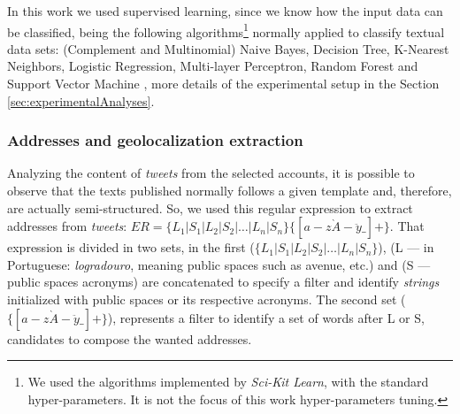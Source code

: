 \documentclass[runningheads]{llncs}
\begin{document}

In this work we used supervised learning, since we know how the input data can be classified, being the following algorithms\footnote{We used the algorithms implemented by \textit{Sci-Kit Learn}, with the standard hyper-parameters. It is not the focus of this work hyper-parameters tuning.} normally applied to classify textual data sets: (Complement and Multinomial) Naive Bayes, Decision Tree, K-Nearest Neighbors, Logistic Regression, Multi-layer Perceptron, Random Forest and Support Vector Machine \cite{kotsiantis2007supervised, dwivedi2016automatic, narayanan2017survey}, more details of the experimental setup in the Section \ref{sec:experimentalAnalyses}. 
%

\subsubsection{Addresses and geolocalization extraction}

Analyzing the content of \textit{tweets} from the selected accounts, it is possible to observe that the texts published normally follows a given template and, therefore, are actually semi-structured. So, we used this regular expression to extract addresses from \textit{tweets}: $ER = \lbrace L_1 | S_1 | L_2 | S_2 | \dots | L_n | S_n \rbrace \lbrace [a-z\grave{A}-\ddot{y}\_] + \rbrace$.
That expression is divided in two sets, in the first ($\lbrace L_1 | S_1 | L_2 | S_2 | \dots | L_n | S_n \rbrace $), (L --- in Portuguese: \textit{logradouro}, meaning public spaces such as avenue, etc.) and (S --- public spaces acronyms) are concatenated to specify a filter and identify \textit{strings} initialized with public spaces or its respective acronyms. The second set ($\lbrace [a-z\grave{A}-\ddot{y}\_] + \rbrace $), represents a filter to identify a set of words after L or S, candidates to compose the wanted addresses.
\end{document}
